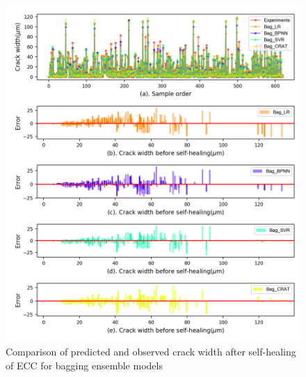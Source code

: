\documentclass[11pt]{article}
\begin{document}
			\begin{figure}[!h]
		\centering
		\includegraphics[width=\textwidth]{bagError.png}
		\caption{Comparison of predicted and observed crack width after self-healing of ECC for  bagging ensemble models}
		\label{error2}
	\end{figure}
	
\end{document}
